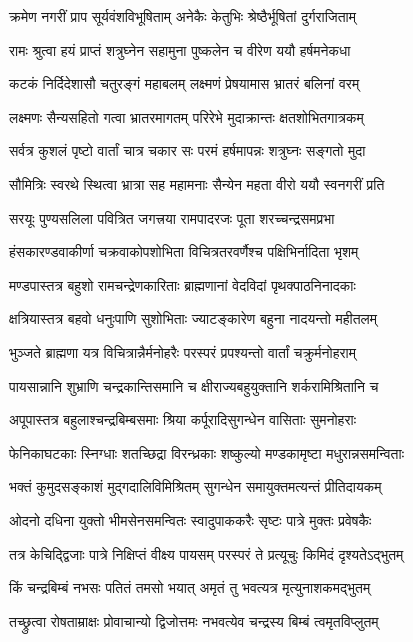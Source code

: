 \twolineshloka
{क्रमेण नगरीं प्राप सूर्यवंशविभूषिताम्}
{अनेकैः केतुभिः श्रेष्ठैर्भूषितां दुर्गराजिताम्}%

\twolineshloka
{रामः श्रुत्वा हयं प्राप्तं शत्रुघ्नेन सहामुना}
{पुष्कलेन च वीरेण ययौ हर्षमनेकधा}%

\twolineshloka
{कटकं निर्दिदेशासौ चतुरङ्गं महाबलम्}
{लक्ष्मणं प्रेषयामास भ्रातरं बलिनां वरम्}%

\twolineshloka
{लक्ष्मणः सैन्यसहितो गत्वा भ्रातरमागतम्}
{परिरेभे मुदाक्रान्तः क्षतशोभितगात्रकम्}%

\twolineshloka
{सर्वत्र कुशलं पृष्टो वार्तां चात्र चकार सः}
{परमं हर्षमापन्नः शत्रुघ्नः सङ्गतो मुदा}%

\twolineshloka
{सौमित्रिः स्वरथे स्थित्वा भ्रात्रा सह महामनाः}
{सैन्येन महता वीरो ययौ स्वनगरीं प्रति}%

\twolineshloka
{सरयूः पुण्यसलिला पवित्रित जगत्त्रया}
{रामपादरजः पूता शरच्चन्द्रसमप्रभा}%

\twolineshloka
{हंसकारण्डवाकीर्णा चक्रवाकोपशोभिता}
{विचित्रतरवर्णैश्च पक्षिभिर्नादिता भृशम्}%

\twolineshloka
{मण्डपास्तत्र बहुशो रामचन्द्रेणकारिताः}
{ब्राह्मणानां वेदविदां पृथक्पाठनिनादकाः}%

\twolineshloka
{क्षत्रियास्तत्र बहवो धनुःपाणि सुशोभिताः}
{ज्याटङ्कारेण बहुना नादयन्तो महीतलम्}%

\twolineshloka
{भुञ्जते ब्राह्मणा यत्र विचित्रान्नैर्मनोहरैः}
{परस्परं प्रपश्यन्तो वार्तां चक्रुर्मनोहराम्}%

\twolineshloka
{पायसान्नानि शुभ्राणि चन्द्रकान्तिसमानि च}
{क्षीराज्यबहुयुक्तानि शर्करामिश्रितानि च}%

\twolineshloka
{अपूपास्तत्र बहुलाश्चन्द्रबिम्बसमाः श्रिया}
{कर्पूरादिसुगन्धेन वासिताः सुमनोहराः}%

\twolineshloka
{फेनिकाघटकाः स्निग्धाः शतच्छिद्रा विरन्ध्रकाः}
{शष्कुल्यो मण्डकामृष्टा मधुरान्नसमन्विताः}%

\twolineshloka
{भक्तं कुमुदसङ्काशं मुद्गदालिविमिश्रितम्}
{सुगन्धेन समायुक्तमत्यन्तं प्रीतिदायकम्}%

\twolineshloka
{ओदनो दधिना युक्तो भीमसेनसमन्वितः}
{स्वादुपाककरैः सृष्टः पात्रे मुक्तः प्रवेषकैः}%

\twolineshloka
{तत्र केचिद्द्विजाः पात्रे निक्षिप्तं वीक्ष्य पायसम्}
{परस्परं ते प्रत्यूचुः किमिदं दृश्यतेऽद्भुतम्}%

\twolineshloka
{किं चन्द्रबिम्बं नभसः पतितं तमसो भयात्}
{अमृतं तु भवत्यत्र मृत्युनाशकमद्भुतम्}%

\twolineshloka
{तच्छ्रुत्वा रोषताम्राक्षः प्रोवाचान्यो द्विजोत्तमः}
{नभवत्येव चन्द्रस्य बिम्बं त्वमृतविप्लुतम्}%

